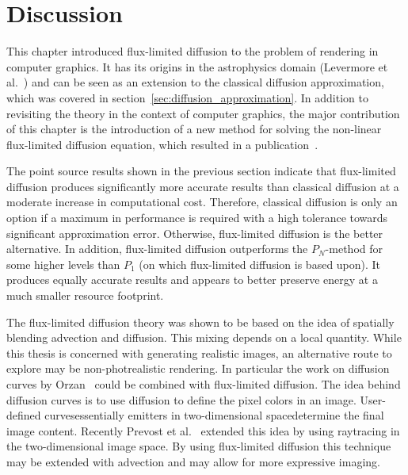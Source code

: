\section{Discussion}
\label{sec:fld_discussion}

This chapter introduced flux-limited diffusion to the problem of rendering in computer graphics. It has its origins in the astrophysics domain (Levermore et al.~\cite{Levermore81}) and can be seen as an extension to the classical diffusion approximation, which was covered in section~\ref{sec:diffusion_approximation}. In addition to revisiting the theory in the context of computer graphics, the major contribution of this chapter is the introduction of a new method for solving the non-linear flux-limited diffusion equation, which resulted in a publication~\cite{Koerner14}.

The point source results shown in the previous section indicate that flux-limited diffusion produces significantly more accurate results than classical diffusion at a moderate increase in computational cost. Therefore, classical diffusion is only an option if a maximum in performance is required with a high tolerance towards significant approximation error. Otherwise, flux-limited diffusion is the better alternative. In addition, flux-limited diffusion outperforms the $P_N$-method for some higher levels than $P_1$ (on which flux-limited diffusion is based upon). It produces equally accurate results and appears to better preserve energy at a much smaller resource footprint.

The flux-limited diffusion theory was shown to be based on the idea of spatially blending advection and diffusion. This mixing depends on a local quantity. While this thesis is concerned with generating realistic images, an alternative route to explore may be non-photrealistic rendering. In particular the work on diffusion curves by Orzan~\cite{Orzan08} could be combined with flux-limited diffusion. The idea behind diffusion curves is to use diffusion to define the pixel colors in an image. User-defined curves\mydash essentially emitters in two-dimensional space\mydash determine the final image content. Recently Prevost et al.~\cite{Prevost15} extended this idea by using raytracing in the two-dimensional image space. By using flux-limited diffusion this technique may be extended with advection and may allow for more expressive imaging.

